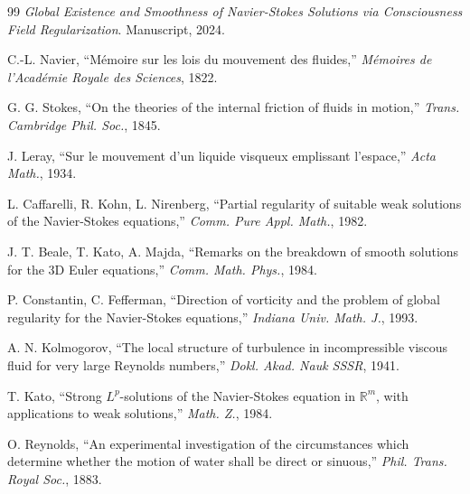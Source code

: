 \begin{thebibliography}{99}
\textit{Global Existence and Smoothness of Navier-Stokes Solutions via Consciousness Field Regularization}. Manuscript, 2024.

C.-L. Navier, ``Mémoire sur les lois du mouvement des fluides,'' \textit{Mémoires de l'Académie Royale des Sciences}, 1822.

G. G. Stokes, ``On the theories of the internal friction of fluids in motion,'' \textit{Trans. Cambridge Phil. Soc.}, 1845.

J. Leray, ``Sur le mouvement d'un liquide visqueux emplissant l'espace,'' \textit{Acta Math.}, 1934.

L. Caffarelli, R. Kohn, L. Nirenberg, ``Partial regularity of suitable weak solutions of the Navier-Stokes equations,'' \textit{Comm. Pure Appl. Math.}, 1982.

J. T. Beale, T. Kato, A. Majda, ``Remarks on the breakdown of smooth solutions for the 3D Euler equations,'' \textit{Comm. Math. Phys.}, 1984.

P. Constantin, C. Fefferman, ``Direction of vorticity and the problem of global regularity for the Navier-Stokes equations,'' \textit{Indiana Univ. Math. J.}, 1993.

A. N. Kolmogorov, ``The local structure of turbulence in incompressible viscous fluid for very large Reynolds numbers,'' \textit{Dokl. Akad. Nauk SSSR}, 1941.

T. Kato, ``Strong $L^p$-solutions of the Navier-Stokes equation in $\mathbb{R}^m$, with applications to weak solutions,'' \textit{Math. Z.}, 1984.

O. Reynolds, ``An experimental investigation of the circumstances which determine whether the motion of water shall be direct or sinuous,'' \textit{Phil. Trans. Royal Soc.}, 1883.
\end{thebibliography}
